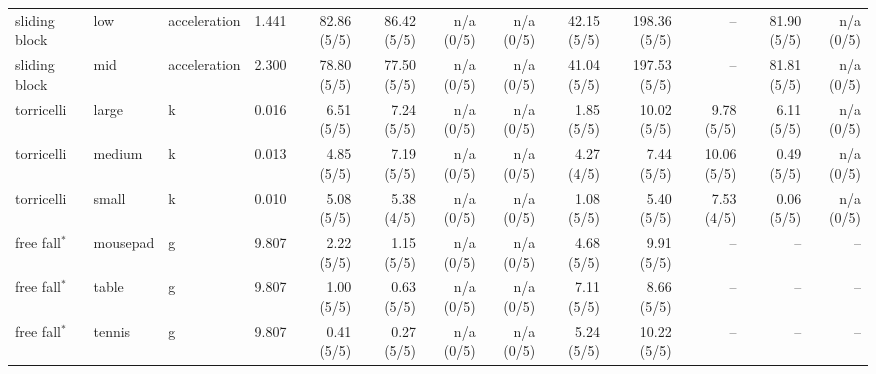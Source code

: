 \begin{tabular}{lll r r r r r r r r r r}
sliding block & low & acceleration & 1.441 & 82.86 (5/5) & 86.42 (5/5) & n/a (0/5) & n/a (0/5) & 42.15 (5/5) & 198.36 (5/5) & -- & 81.90 (5/5) & n/a (0/5) \\
sliding block & mid & acceleration & 2.300 & 78.80 (5/5) & 77.50 (5/5) & n/a (0/5) & n/a (0/5) & 41.04 (5/5) & 197.53 (5/5) & -- & 81.81 (5/5) & n/a (0/5) \\
torricelli & large & k & 0.016 & 6.51 (5/5) & 7.24 (5/5) & n/a (0/5) & n/a (0/5) & 1.85 (5/5) & 10.02 (5/5) & 9.78 (5/5) & 6.11 (5/5) & n/a (0/5) \\
torricelli & medium & k & 0.013 & 4.85 (5/5) & 7.19 (5/5) & n/a (0/5) & n/a (0/5) & 4.27 (4/5) & 7.44 (5/5) & 10.06 (5/5) & 0.49 (5/5) & n/a (0/5) \\
torricelli & small & k & 0.010 & 5.08 (5/5) & 5.38 (4/5) & n/a (0/5) & n/a (0/5) & 1.08 (5/5) & 5.40 (5/5) & 7.53 (4/5) & 0.06 (5/5) & n/a (0/5) \\
free fall$^\ast$ & mousepad & g & 9.807 & 2.22 (5/5) & 1.15 (5/5) & n/a (0/5) & n/a (0/5) & 4.68 (5/5) & 9.91 (5/5) & -- & -- & -- \\
free fall$^\ast$ & table & g & 9.807 & 1.00 (5/5) & 0.63 (5/5) & n/a (0/5) & n/a (0/5) & 7.11 (5/5) & 8.66 (5/5) & -- & -- & -- \\
free fall$^\ast$ & tennis & g & 9.807 & 0.41 (5/5) & 0.27 (5/5) & n/a (0/5) & n/a (0/5) & 5.24 (5/5) & 10.22 (5/5) & -- & -- & -- \\
\bottomrule
\end{tabular}
